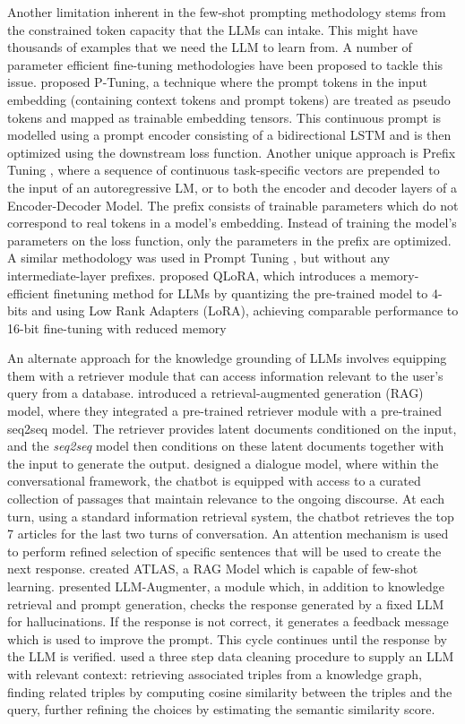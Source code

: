 Another limitation inherent in the few-shot prompting methodology stems from the constrained token capacity that the LLMs can intake. This might have thousands of examples that we need the LLM to learn from. A number of parameter efficient fine-tuning methodologies have been proposed to tackle this issue. 
\cite{liu2021gpt} proposed P-Tuning, a technique where the prompt tokens in the input embedding (containing context tokens and prompt tokens) are treated as pseudo tokens and mapped as trainable embedding tensors. This continuous prompt is modelled using a prompt encoder consisting of a bidirectional LSTM and is then optimized using the downstream loss function. Another unique approach is Prefix Tuning \citep{li2021prefix}, where a sequence of continuous task-specific vectors are prepended to the input of an autoregressive LM, or to both the encoder and decoder layers of a Encoder-Decoder Model. The prefix consists of trainable parameters which do not correspond to real tokens in a model's embedding. Instead of training the model's parameters on the loss function, only the parameters in the prefix are optimized. A similar methodology was used in Prompt Tuning \citep{lester2021power}, but without any intermediate-layer prefixes. \cite{dettmers2024qlora} proposed QLoRA, which introduces a memory-efficient finetuning method for LLMs by quantizing the pre-trained model to 4-bits and using Low Rank Adapters (LoRA), achieving comparable performance to 16-bit fine-tuning with reduced memory

An alternate approach for the knowledge grounding of LLMs involves equipping them with a retriever module that can access information relevant to the user's query from a database. \cite{lewis2020retrieval} introduced a retrieval-augmented generation (RAG) model, where they integrated a pre-trained retriever module with a pre-trained seq2seq model. The retriever provides latent documents conditioned on the input, and the {\it seq2seq} model then conditions on these latent documents together with the input to generate the output. \cite{dinan2018wizard} designed a dialogue model, where within the conversational framework, the chatbot is equipped with access to a curated collection of passages that maintain relevance to the ongoing discourse. At each turn, using a standard information retrieval system, the chatbot retrieves the top 7 articles for the last two turns of conversation. An attention mechanism is used to perform refined selection of specific sentences that will be used to create the next response. 
\cite{izacard2022few} created ATLAS, a RAG Model which is capable of few-shot learning.
\cite{peng2023check} presented LLM-Augmenter, a module which, in addition to knowledge retrieval and prompt generation, checks the response generated by a fixed LLM for hallucinations. If the response is not correct, it generates a feedback message which is used to improve the prompt. This cycle continues until the response by the LLM is verified. \cite{li2021knowledge} used a three step data cleaning procedure to supply an LLM with relevant context: retrieving associated triples from a knowledge graph, finding related triples by computing cosine similarity between the triples and the query, further refining the choices by estimating the semantic similarity score. 

